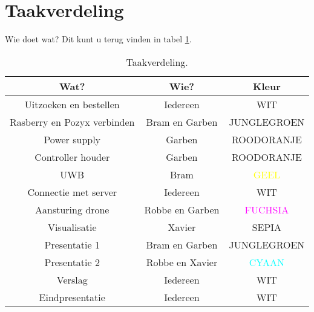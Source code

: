 \section{Taakverdeling} \label{sec:taakverdeling}
Wie doet wat? Dit kunt u terug vinden in tabel \ref{tab:taakverdeling}.
\begin{table}[p]
\centering
\begin{tabular}{ |c|c|c| } \hline
Wat? & Wie? & Kleur \\ [.5ex] \hline\hline
Uitzoeken en bestellen & Iedereen & WIT \\ \hline
Rasberry en Pozyx verbinden & Bram en Garben & \textcolor{JungleGreen}{JUNGLEGROEN} \\ \hline
Power supply & Garben & \textcolor{RedOrange}{ROODORANJE} \\ \hline
Controller houder & Garben & \textcolor{RedOrange}{ROODORANJE} \\ \hline
UWB & Bram & \textcolor{Yellow}{GEEL} \\ \hline
Connectie met server & Iedereen & WIT \\ \hline
Aansturing drone & Robbe en Garben & \textcolor{Fuchsia}{FUCHSIA} \\ \hline
Visualisatie & Xavier & \textcolor{Sepia}{SEPIA} \\ \hline
Presentatie 1 & Bram en Garben & \textcolor{JungleGreen}{JUNGLEGROEN} \\ \hline
Presentatie 2 & Robbe en Xavier & \textcolor{Cyan}{CYAAN} \\ \hline
Verslag & Iedereen & WIT \\ \hline
Eindpresentatie & Iedereen & WIT \\ \hline
\end{tabular}
\caption[Taakverdeling]{Taakverdeling.}
\label{tab:taakverdeling}
\end{table}

